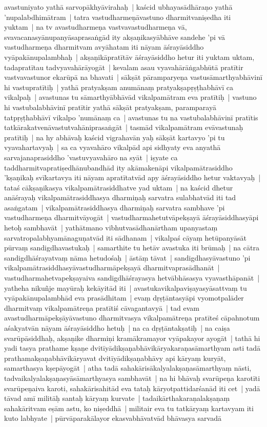 \documentclass[article,12pt,a4paper]{memoir}%
\begin{document}
avastuniyato yathā sarvopākhyāvirahaḥ | kaścid ubhayasādhāraṇo yathā 'nupalabdhimātram | tatra vastudharmeṇāvastuno dharmitvaniṣedha iti yuktam | na tv avastudharmeṇa vastvavastudharmeṇa vā, svavacanasyānupanyāsaprasaṅgād ity akṣaṇikasyābhāve sandehe 'pi vā vastudharmeṇa dharmitvam avyāhatam iti nāyam āśrayāsiddho vyāpakānupalambhaḥ | \label{thakur75-89.6} akṣaṇikāpratītāv āśrayāsiddho hetur iti yuktam uktam, tadapratītau tadvyavahārāyogāt | kevalam asau vyavahārāṅgabhūtā pratītir vastvavastunor ekarūpā na bhavati | sākṣāt pāramparyeṇa vastusāmarthyabhāvinī hi vastupratītiḥ | yathā pratyakṣam anumānaṃ pratyakṣapṛṣṭhabhāvī ca vikalpaḥ | avastunas tu sāmarthyābhāvād vikalpamātram eva pratītiḥ | vastuno hi vastubalabhāvinī pratītir yathā sākṣāt pratyakṣam, paramparayā tatpṛṣṭhabhāvī vikalpo 'numānaṃ ca | avastunas tu na vastubalabhāvinī pratītis tatkārakatvenāvastutvahāniprasaṅgāt | tasmād vikalpamātram evāvastunaḥ pratītiḥ | \label{thakur75-89.12} na hy abhāvaḥ kaścid vigrahavān yaḥ sākṣāt kartavyo 'pi tu vyavahartavyaḥ | sa ca vyavahāro vikalpād api sidhyaty eva anyathā sarvajanaprasiddho 'vastuvyavahāro na syāt | iṣyate ca taddharmitvapratiṣedhānubandhād ity akāmakenāpi vikalpamātrasiddho 'kṣaṇikaḥ svīkartavya iti nāyam apratītatvād apy āśrayāsiddho hetur vaktavyaḥ | tataś cākṣaṇikasya vikalpamātrasiddhatve yad uktam | \label{thakur75-89.17} na kaścid dhetur anāśrayaḥ vikalpamātrasiddhasya dharmiṇaḥ sarvatra sulabhatvād iti tad asaṅgatam | vikalpamātrasiddhasya dharmiṇaḥ sarvatra sambhave 'pi vastudharmeṇa dharmitvāyogāt | vastudharmahetutvāpekṣayā āśrayāsiddhasyāpi hetoḥ sambhavāt | \label{thakur75-89.20} yathātmano vibhutvasādhanārtham upanyastaṃ sarvatropalabhyamānaguṇatvād iti sādhanam | vikalpaś cāyaṃ hetūpanyāsāt pūrvaṃ sandigdhavastukaḥ | samarthite tu hetāv avastuka iti brūmaḥ | \label{thakur75-89.23} na cātra sandigdhāśrayatvaṃ nāma hetudośaḥ | āstāṃ tāvat | sandigdhasyāvastuno 'pi vikalpamātrasiddhasyāvastudharmāpekṣayā dharmitvaprasādhanāt | vastudharmahetvapekṣayaiva sandigdhāśrayasya hetvābhāsasya vyavasthāpanāt | yatheha nikuñje mayūraḥ kekāyitād iti | avastukavikalpaviṣayasyāsattvaṃ tu vyāpakānupalambhād eva prasādhitam | evaṃ dṛṣṭāntasyāpi vyomotpalāder dharmitvaṃ vikalpamātreṇa pratītiś cāvagantavyā | tad evam avastudharmāpekṣāyāvastuno dharmitvasya vikalpamātreṇa pratīteś cāpahnotum aśakyatvān nāyam āśrayāsiddho hetuḥ | na ca dṛṣṭāntakṣatiḥ | \label{thakur75-89.30} na caiṣa svarūpāsiddhaḥ, akṣaṇike dharmiṇi kramākramayor vyāpakayor ayogāt | tathā hi yadi tasya prathame kṣaṇe dvitīyādikṣaṇabhāvikāryakaraṇasāmarthyam asti tadā prathamakṣaṇabhāvikāryavat dvitīyādikṣaṇabhāvy api kāryaṃ kuryāt, samarthasya kṣepāyogāt | \label{thakur75-90.2} atha tadā sahakārisākalyalakṣaṇasāmarthyaṃ nāsti, tadvaikalyalakṣaṇasyāsāmarthyasya sambhavāt | na hi bhāvaḥ svarūpeṇa karotīti svarūpeṇaiva karoti, sahakārisahitād eva tataḥ kāryotpattidarśanād iti cet | \label{thakur75-90.4} yadā tāvad amī militāḥ santaḥ kāryaṃ kurvate | tadaikārthakaraṇalakṣaṇaṃ sahakāritvam eṣām astu, ko niṣeddhā | militair eva tu tatkāryaṃ kartavyam iti kuto labhyate | pūrvāparakālayor ekasvabhāvatvād bhāvasya sarvadā 
\end{document}
